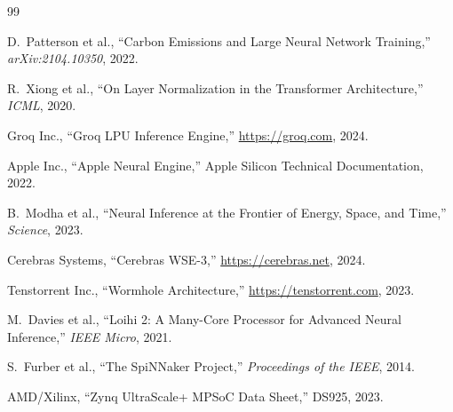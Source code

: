 \documentclass[11pt]{article}
\begin{document}
\begin{thebibliography}{99}

D.~Patterson et al., ``Carbon Emissions and Large Neural Network Training,'' \emph{arXiv:2104.10350}, 2022.

R.~Xiong et al., ``On Layer Normalization in the Transformer Architecture,''
\emph{ICML}, 2020.

Groq Inc., ``Groq LPU Inference Engine,'' \url{https://groq.com}, 2024.

Apple Inc., ``Apple Neural Engine,'' Apple Silicon Technical Documentation, 2022.

B.~Modha et al., ``Neural Inference at the Frontier of Energy, Space, and Time,''
\emph{Science}, 2023.

Cerebras Systems, ``Cerebras WSE-3,'' \url{https://cerebras.net}, 2024.

Tenstorrent Inc., ``Wormhole Architecture,'' \url{https://tenstorrent.com}, 2023.

M.~Davies et al., ``Loihi 2: A Many-Core Processor for Advanced Neural Inference,''
\emph{IEEE Micro}, 2021.

S.~Furber et al., ``The SpiNNaker Project,'' \emph{Proceedings of the IEEE}, 2014.

AMD/Xilinx, ``Zynq UltraScale+ MPSoC Data Sheet,'' DS925, 2023.

\end{thebibliography}
\end{document}
